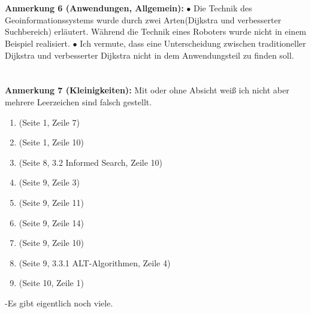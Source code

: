 \documentclass[a4paper,12pt]{book}
\begin{document}
\\
\\
\textbf{Anmerkung 6 (Anwendungen, Allgemein):}
\newline
$\bullet$ Die Technik des Geoinformationssystems wurde durch zwei Arten(Dijkstra und verbesserter Suchbereich) erläutert. Während die Technik eines Roboters wurde nicht in einem Beispiel realisiert.
\newline
$\bullet$ Ich vermute, dass eine Unterscheidung zwischen traditioneller Dijkstra und verbesserter Dijkstra nicht in dem Anwendungsteil zu finden soll. 
\newline 
 \\
 \\
\\
\textbf{Anmerkung 7 (Kleinigkeiten):}
Mit oder ohne Absicht weiß ich nicht aber mehrere Leerzeichen sind falsch gestellt.
\begin{enumerate}
	\item  (Seite 1, Zeile 7)
	\item  (Seite 1, Zeile 10)
	\item  (Seite 8, 3.2 Informed Search, Zeile 10)
	\item  (Seite 9, Zeile 3)
	\item  (Seite 9, Zeile 11)
	\item  (Seite 9, Zeile 14)
	\item  (Seite 9, Zeile 10)
	\item  (Seite 9, 3.3.1 ALT-Algorithmen, Zeile 4)
	\item  (Seite 10, Zeile 1)
\end{enumerate}
-Es gibt eigentlich noch viele.
\\
\\
\end{document}
